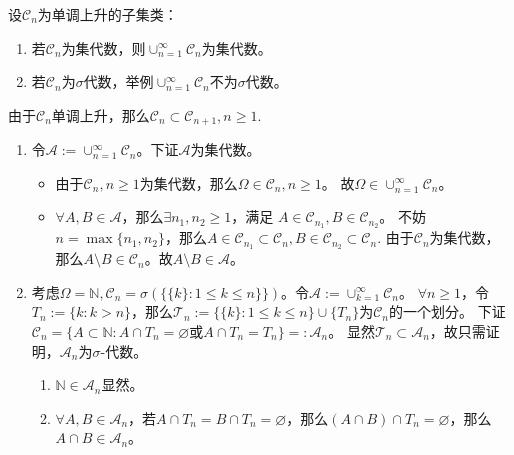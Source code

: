 \documentclass{ctexart}
\begin{document}
\begin{problem} 
  设\(\mathcal{C}_n \)为单调上升的子集类：
  \begin{enumerate}
    \item 若\(\mathcal{C}_n \)为集代数，则\(\cup_{n=1}^{\infty}\mathcal{C}_n \)为集代数。
    \item 若\(\mathcal{C}_n \)为\(\sigma \)代数，举例\(\cup_{n=1}^{\infty}\mathcal{C}_n \)不为\(\sigma \)代数。
  \end{enumerate}
\end{problem}
\begin{solution}
由于\(\mathcal{C}_n \)单调上升，那么\(\mathcal{C}_n \subset \mathcal{C}_{n + 1}, n \geq 1 \).
\begin{enumerate}
  \item 令\(\mathcal{A}:=\cup_{n=1}^{\infty} \mathcal{C}_n \)。下证\(\mathcal{A} \)为集代数。
    \begin{itemize}
      \item 由于\(\mathcal{C}_n,n \geq 1\)为集代数，那么\(\Omega \in \mathcal{C}_n ,n \geq 1 \)。 故\(\Omega \in \cup_{n=1}^{\infty} \mathcal{C}_n \)。
      \item \(\forall A,B \in \mathcal{A} \)，那么\(\exists n_1,n_2 \geq 1 \)，满足 \(A \in \mathcal{C}_{n_1},B \in \mathcal{C}_{n_2} \)。
        不妨\(n = \max\{n_1,n_2\} \)，那么\(A \in \mathcal{C}_{n_1} \subset \mathcal{C}_n, B \in \mathcal{C}_{n_2} \subset \mathcal{C}_n\).
        由于\(\mathcal{C}_n \)为集代数，那么\(A \setminus B \in \mathcal{C}_n \)。故\(A \setminus B \in \mathcal{A} \)。
    \end{itemize}
  \item 考虑\(\Omega=\mathbb{N},\mathcal{C}_n=\sigma(\{\{k\}: 1 \leq k \leq n\}\}) \)。令\( \mathcal{A}:=\cup_{k=1}^{\infty}\mathcal{C}_n\)。
    \(\forall n \geq 1 \)，令\(T_n:=\{k: k >n\} \)，那么\(\mathcal{T}_n:=\{\{k\} : 1 \leq k \leq n\} \cup \{T_n\} \)为\(\mathcal{C}_n \)的一个划分。
    下证\(\mathcal{C}_n=\{A \subset \mathbb{N}: A \cap T_n = \varnothing \text{或} A \cap T_n =T_n\}=:\mathcal{A}_n \)。
    显然\( \mathcal{T}_n \subset \mathcal{A}_n\)，故只需证明，\(\mathcal{A}_n \)为\(\sigma \)-代数。
    \begin{enumerate}
      \item \(\mathbb{N} \in \mathcal{A}_n \)显然。
      \item \(\forall A,B  \in \mathcal{A}_n\)，若\(A \cap T_n=B \cap T_n=\varnothing \)，那么\((A \cap B) \cap T_n =\varnothing \)，那么\(A \cap B \in \mathcal{A}_n \)。

\end{enumerate}
\end{enumerate}
\end{solution}
\end{document}
